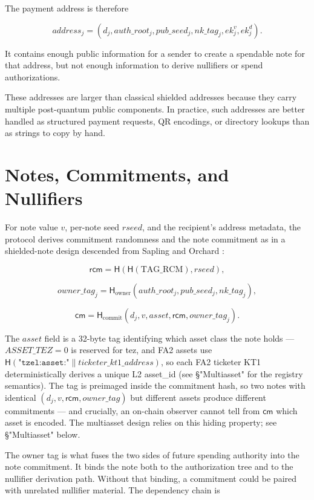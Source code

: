 \documentclass[11pt]{article}
\newcommand{\Hash}{\mathsf{H}}
\newcommand{\cm}{\mathsf{cm}}
\newcommand{\rcm}{\mathsf{rcm}}
\begin{document}
The payment address is therefore

\[
address_j = (d_j, auth\_root_j, pub\_seed_j, nk\_tag_j, ek^v_j, ek^d_j).
\]

It contains enough public information for a sender to create a spendable note
for that address, but not enough information to derive nullifiers or spend
authorizations.

These addresses are larger than classical shielded addresses because they carry
multiple post-quantum public components. In practice, such addresses are better
handled as structured payment requests, QR encodings, or directory lookups than
as strings to copy by hand.

\section{Notes, Commitments, and Nullifiers}

For note value \(v\), per-note seed \(rseed\), and the recipient's address
metadata, the protocol derives commitment randomness and the note commitment as
in a shielded-note design descended from Sapling and Orchard
\cite{zcash-protocol,zcash-orchard}:

\[
\rcm = \Hash(\Hash(\mathrm{TAG\_RCM}), rseed),
\]

\[
owner\_tag_j = \Hash_{\mathrm{owner}}(auth\_root_j, pub\_seed_j, nk\_tag_j),
\]

\[
\cm = \Hash_{\mathrm{commit}}(d_j, v, asset, \rcm, owner\_tag_j).
\]

The \(asset\) field is a 32-byte tag identifying which asset class the note
holds — \(ASSET\_TEZ = 0\) is reserved for tez, and FA2 assets use
\(\Hash(\texttt{"tzel:asset:"} \| ticketer\_kt1\_address)\), so each FA2
ticketer KT1 deterministically derives a unique L2 asset\_id (see
§"Multiasset" for the registry semantics). The tag is preimaged inside the commitment hash,
so two notes with identical \((d_j, v, \rcm, owner\_tag)\) but different
assets produce different commitments — and crucially, an on-chain observer
cannot tell from \(\cm\) which asset is encoded. The multiasset design
relies on this hiding property; see §"Multiasset" below.

The owner tag is what fuses the two sides of future spending authority into the
note commitment. It binds the note both to the authorization tree and to the
nullifier derivation path. Without that binding, a commitment could be paired
with unrelated nullifier material. The dependency chain is
\end{document}
